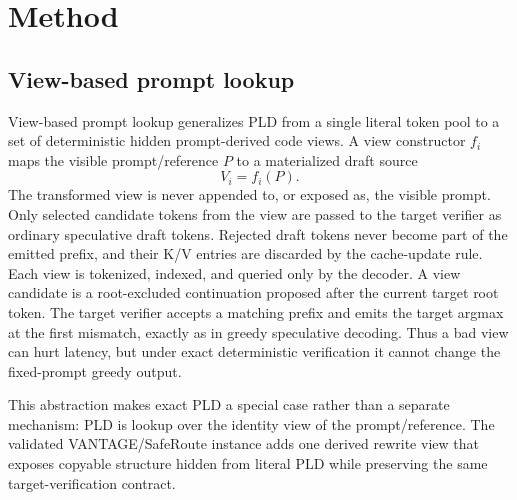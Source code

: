 \documentclass[11pt,a4paper]{article}
\begin{document}
\begin{table}[h]
\centering\scriptsize
\caption{Reference-drift regimes and expected draft behavior.}
\label{tab:regimes}
\end{table}

\section{Method}
\label{sec:method}

\subsection{View-based prompt lookup}

View-based prompt lookup generalizes PLD from a single literal token pool to a
set of deterministic hidden prompt-derived code views. A view constructor
$f_i$ maps the visible prompt/reference $P$ to a materialized draft source
\[
  V_i = f_i(P).
\]
The transformed view is never appended to, or exposed as, the visible prompt.
Only selected candidate tokens from the view are passed to the target verifier
as ordinary speculative draft tokens. Rejected draft tokens never become part
of the emitted prefix, and their K/V entries are discarded by the cache-update
rule. Each view is tokenized, indexed, and
queried only by the decoder. A view candidate is a root-excluded continuation
proposed after the current target root token. The target verifier accepts a
matching prefix and emits the target argmax at the first mismatch, exactly as
in greedy speculative decoding.
Thus a bad view can hurt latency, but under exact deterministic verification it
cannot change the fixed-prompt greedy output.

This abstraction makes exact PLD a special case rather than a separate
mechanism: PLD is lookup over the identity view of the prompt/reference. The
validated VANTAGE/SafeRoute instance adds one derived rewrite view that exposes
copyable structure hidden from literal PLD while preserving the same
target-verification contract.
\end{document}
